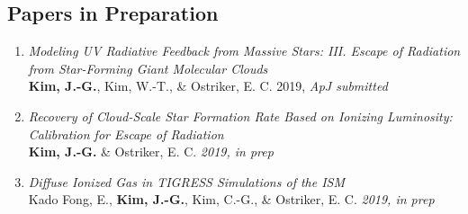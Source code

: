 \subsection{Papers in Preparation}
\begin{enumerate}
\item[] \textit{Modeling UV Radiative Feedback from Massive Stars: III. Escape
    of Radiation from Star-Forming Giant Molecular Clouds} \\ \textbf{Kim,
    J.-G.}, Kim, W.-T., \& Ostriker, E. C. 2019, \textit{ApJ submitted}
\item[] \textit{Recovery of Cloud-Scale Star Formation Rate Based on Ionizing
    Luminosity: Calibration for Escape of Radiation} \\ \textbf{Kim, J.-G.} \&
  Ostriker, E. C. \textit{2019, in prep}
\item[] \textit{Diffuse Ionized Gas in TIGRESS Simulations of the ISM}\\ Kado
  Fong, E., \textbf{Kim, J.-G.}, Kim, C.-G., \& Ostriker, E. C. \textit{2019, in
    prep}
\end{enumerate}


